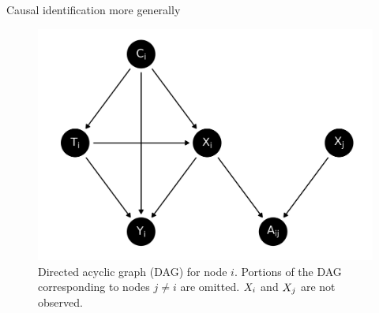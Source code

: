 \documentclass{beamer}
\theoremstyle{remark}
\begin{document}
\begin{frame}{Causal identification more generally}

    \centering

    \begin{figure}
        \includegraphics[scale=0.6]{figures/dag-mediating.png}
        \caption{Directed acyclic graph (DAG) for node $i$. Portions of the DAG corresponding to nodes $j \neq i$ are omitted. $X_i$ and $X_j$ are not observed.}
        \label{fig:mediating}
    \end{figure}

\end{frame}
\end{document}

